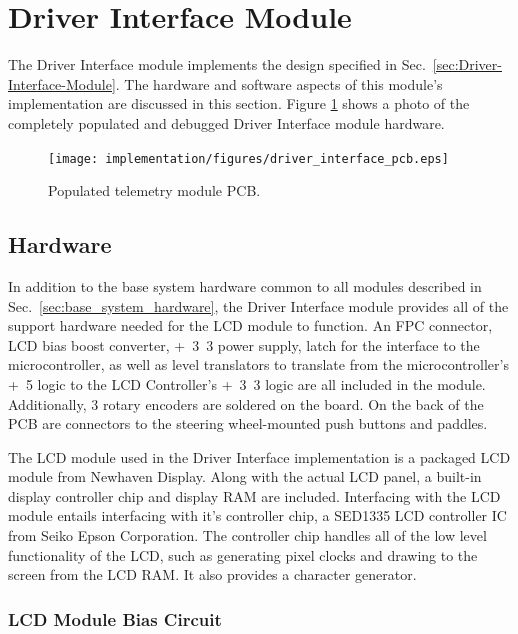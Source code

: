 \section{Driver Interface Module}

The Driver Interface module implements the design specified in Sec.\ \ref{sec:Driver-Interface-Module}. The hardware and software aspects of this module's implementation are discussed in this section. Figure \ref{fig:driver_interface_pcb} shows a photo of the completely populated and debugged Driver Interface module hardware.

\begin{figure}[h]
\centering
\texttt{[image: implementation/figures/driver\_interface\_pcb.eps]}
\caption{Populated telemetry module PCB.}\label{fig:driver_interface_pcb}
\end{figure}

\subsection{Hardware}

In addition to the base system hardware common to all modules described in Sec.\ \ref{sec:base_system_hardware}, the Driver Interface module provides all of the support hardware needed for the LCD module to function. An FPC connector, LCD bias boost converter, \unit{+3.3}{\volt} power supply, latch for the interface to the microcontroller, as well as level translators to translate from the microcontroller's \unit{+5}{\volt} logic to the LCD Controller's \unit{+3.3}{\volt} logic are all included in the module. Additionally, 3 rotary encoders are soldered on the board. On the back of the PCB are connectors to the steering wheel-mounted push buttons and paddles.

The LCD module used in the Driver Interface implementation is a packaged LCD module from Newhaven Display. Along with the actual LCD panel, a built-in display controller chip and display RAM are included. Interfacing with the LCD module entails interfacing with it's controller chip, a SED1335 LCD controller IC from Seiko Epson Corporation. The controller chip handles all of the low level functionality of the LCD, such as generating pixel clocks and drawing to the screen from the LCD RAM. It also provides a character generator.

\subsubsection{LCD Module Bias Circuit}

